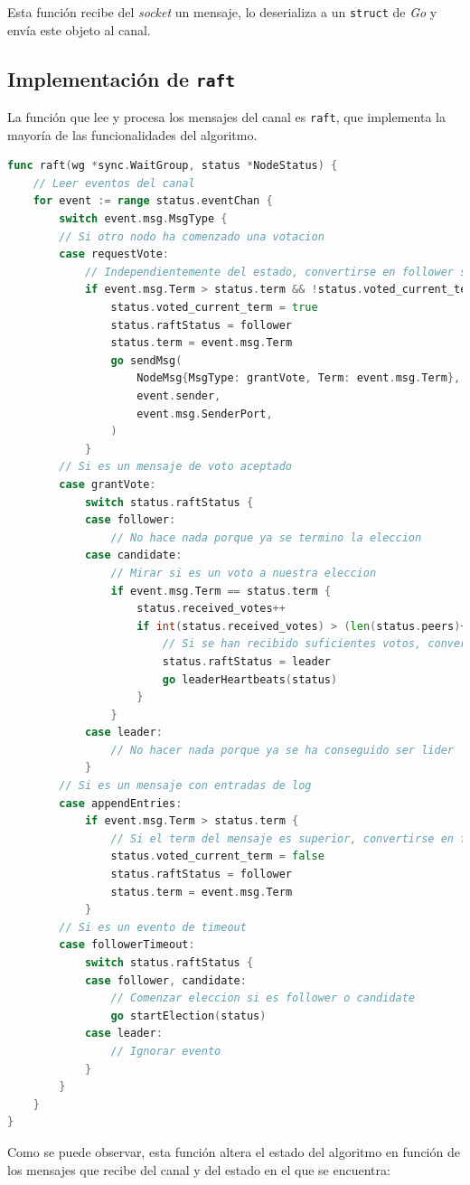 Esta función recibe del \textit{socket} un mensaje, lo deserializa a un \texttt{struct} de \textit{Go} \cite{gostructs} y envía este objeto al canal.

\subsection{Implementación de \texttt{raft}}

La función que lee y procesa los mensajes del canal es \texttt{raft}, que implementa la mayoría de las funcionalidades del algoritmo.

\begin{lstlisting}[language=go]
func raft(wg *sync.WaitGroup, status *NodeStatus) {
	// Leer eventos del canal
	for event := range status.eventChan {
		switch event.msg.MsgType {
		// Si otro nodo ha comenzado una votacion		
		case requestVote:
			// Independientemente del estado, convertirse en follower si el term del mensaje es superior y si no se ha votado en el term actual
			if event.msg.Term > status.term && !status.voted_current_term {
				status.voted_current_term = true
				status.raftStatus = follower
				status.term = event.msg.Term
				go sendMsg(
					NodeMsg{MsgType: grantVote, Term: event.msg.Term},
					event.sender,
					event.msg.SenderPort,
				)
			}
		// Si es un mensaje de voto aceptado
		case grantVote:
			switch status.raftStatus {
			case follower:
				// No hace nada porque ya se termino la eleccion
			case candidate:
				// Mirar si es un voto a nuestra eleccion
				if event.msg.Term == status.term {
					status.received_votes++
					if int(status.received_votes) > (len(status.peers)+1)/2 {
						// Si se han recibido suficientes votos, convertirse en lider
						status.raftStatus = leader
						go leaderHeartbeats(status)
					}
				}
			case leader:
				// No hacer nada porque ya se ha conseguido ser lider
			}
		// Si es un mensaje con entradas de log
		case appendEntries:
			if event.msg.Term > status.term {
				// Si el term del mensaje es superior, convertirse en follower
				status.voted_current_term = false
				status.raftStatus = follower
				status.term = event.msg.Term
			}
		// Si es un evento de timeout
		case followerTimeout:
			switch status.raftStatus {
			case follower, candidate:
				// Comenzar eleccion si es follower o candidate
				go startElection(status)
			case leader:
				// Ignorar evento
			}
		}
	}
}
\end{lstlisting}

Como se puede observar, esta función altera el estado del algoritmo en función de los mensajes que recibe del canal y del estado en el que se encuentra:

